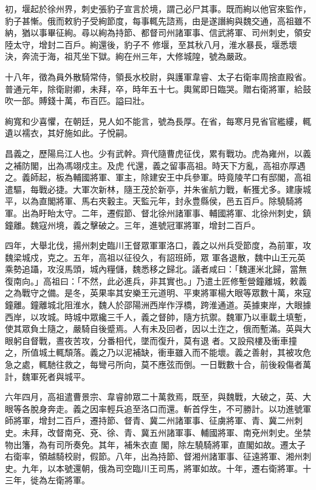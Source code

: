 \begin{pinyinscope}
 初，堰起於徐州界，刺史張豹子宣言於境，謂己必尸其事。既而絢以他官來監作，豹子甚慚。俄而敕豹子受絢節度，每事輒先諮焉，由是遂譖絢與魏交通，高祖雖不納，猶以事畢征絢。尋以絢為持節、都督司州諸軍事、信武將軍、司州刺史，領安陸太守，增封二百戶。絢還後，豹子不
 修堰，至其秋八月，淮水暴長，堰悉壞決，奔流于海，祖芃坐下獄。絢在州三年，大修城隍，號為嚴政。



 十八年，徵為員外散騎常侍，領長水校尉，與護軍韋睿、太子右衛率周捨直殿省。普通元年，除衛尉卿，未拜，卒，時年五十七。輿駕即日臨哭。贈右衛將軍，給鼓吹一部。賻錢十萬，布百匹。謚曰壯。



 絢寬和少喜懼，在朝廷，見人如不能言，號為長厚。在省，每寒月見省官繿縷，輒遺以襦衣，其好施如此。子悅嗣。



 昌義之，歷陽烏江人也。少有武幹。齊代隨曹虎征伐，累有戰功。虎為雍州，以義之補防閣，出為馮翊戍主。及虎
 代還，義之留事高祖。時天下方亂，高祖亦厚遇之。義師起，板為輔國將軍、軍主，除建安王中兵參軍。時竟陵芊口有邸閣，高祖遣驅，每戰必捷。大軍次新林，隨王茂於新亭，并朱雀航力戰，斬獲尤多。建康城平，以為直閣將軍、馬右夾轂主。天監元年，封永豊縣侯，邑五百戶。除驍騎將軍。出為盱眙太守。二年，遷假節、督北徐州諸軍事、輔國將軍、北徐州刺史，鎮鐘離。魏寇州境，義之擊破之。三年，進號冠軍將軍，增封二百戶。



 四年，大舉北伐，揚州刺史臨川王督眾軍軍洛口，義之以州兵受節度，為前軍，攻魏梁城戍，克之。五年，高祖以征役久，有詔班師，眾
 軍各退散，魏中山王元英乘勢追躡，攻沒馬頭，城內糧儲，魏悉移之歸北。議者咸曰：「魏運米北歸，當無復南向。」高祖曰：「不然，此必進兵，非其實也。」乃遣土匠修塹營鐘離城，敕義之為戰守之備。是冬，英果率其安樂王元道明、平東將軍楊大眼等眾數十萬，來寇鐘離。鐘離城北阻淮水，魏人於邵陽洲西岸作浮橋，跨淮通道。英據東岸，大眼據西岸，以攻城。時城中眾纔三千人，義之督帥，隨方抗禦。魏軍乃以車載土填塹，使其眾負土隨之，嚴騎自後蹙焉。人有未及回者，因以土迮之，俄而塹滿。英與大眼躬自督戰，晝夜苦攻，分番相代，墜而復升，莫有退
 者。又設飛樓及衝車撞之，所值城土輒頹落。義之乃以泥補缺，衝車雖入而不能壞。義之善射，其被攻危急之處，輒馳往救之，每彎弓所向，莫不應弦而倒。一日戰數十合，前後殺傷者萬計，魏軍死者與城平。



 六年四月，高祖遣曹景宗、韋睿帥眾二十萬救焉，既至，與魏戰，大破之，英、大眼等各脫身奔走。義之因率輕兵追至洛口而還。斬首俘生，不可勝計。以功進號軍師將軍，增封二百戶，遷持節、督青、冀二州諸軍事、征虜將軍、青、冀二州刺史。未拜，改督南兗、兗、徐、青、冀五州諸軍事、輔國將軍、南兗州刺史。坐禁物出籓，為有司所奏免。其年，補朱衣直
 閣，除左驍騎將軍，直閣如故。遷太子右衛率，領越騎校尉，假節。八年，出為持節、督湘州諸軍事、征遠將軍、湘州刺史。九年，以本號還朝，俄為司空臨川王司馬，將軍如故。十年，遷右衛將軍。十三年，徙為左衛將軍。




\end{pinyinscope}
